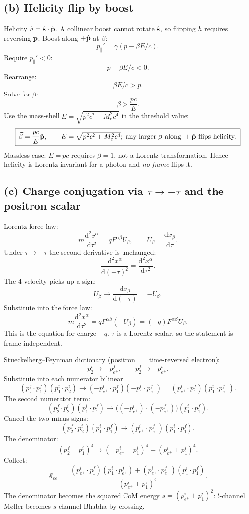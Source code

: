 \documentclass[11pt]{article}
\newcommand{\de}{\mathrm{d}}
\begin{document}
\subsection*{(b) Helicity flip by boost}

Helicity $h=\hat{\vb s}\cdot\hat{\vb p}$. A collinear boost cannot rotate $\hat{\vb s}$, so flipping $h$ requires reversing $\vb p$. Boost along $+\hat{\vb p}$ at $\beta$:
\[ p_\parallel'=\gamma(p-\beta E/c). \]
Require $p_\parallel'<0$:
\[ p-\beta E/c<0. \]
Rearrange:
\[ \beta E/c>p. \]
Solve for $\beta$:
\[ \beta>\frac{pc}{E}. \]
Use the mass-shell $E=\sqrt{p^2c^2+M_e^2c^4}$ in the threshold value:
\begin{equation}
\boxed{\,\vec\beta=\frac{pc}{E}\hat{\vb p},\qquad E=\sqrt{p^2c^2+M_e^2c^4};\ \text{any larger }\beta\text{ along }+\hat{\vb p}\text{ flips helicity}.\,}
\end{equation}
Massless case: $E=pc$ requires $\beta=1$, not a Lorentz transformation. Hence helicity is Lorentz invariant for a photon and \emph{no frame} flips it.

\subsection*{(c) Charge conjugation via $\tau\to-\tau$ and the positron scalar}

Lorentz force law:
\begin{equation}
m\frac{\de^2 x^\alpha}{\de\tau^2}=qF^{\alpha\beta}U_\beta,\qquad U_\beta=\frac{\de x_\beta}{\de\tau}.
\label{eq:Q1c-lf}
\end{equation}
Under $\tau\to-\tau$ the second derivative is unchanged:
\[ \frac{\de^2 x^\alpha}{\de(-\tau)^2}=\frac{\de^2 x^\alpha}{\de\tau^2}. \]
The 4-velocity picks up a sign:
\[ U_\beta\to\frac{\de x_\beta}{\de(-\tau)}=-U_\beta. \]
Substitute into the force law:
\[ m\frac{\de^2 x^\alpha}{\de\tau^2}=qF^{\alpha\beta}(-U_\beta)=(-q)F^{\alpha\beta}U_\beta. \]
This is the equation for charge $-q$. $\tau$ is a Lorentz scalar, so the statement is frame-independent.

Stueckelberg--Feynman dictionary (positron $=$ time-reversed electron):
\[ p_2^i\to -p_{e^+}^f,\qquad p_2^f\to -p_{e^+}^i. \]
Substitute into each numerator bilinear:
\[ (p_2^f\cdot p_1^f)(p_1^i\cdot p_2^i)\to(-p_{e^+}^i\cdot p_1^f)(-p_1^i\cdot p_{e^+}^f)=(p_{e^+}^i\cdot p_1^f)(p_1^i\cdot p_{e^+}^f). \]
The second numerator term:
\[ (p_2^f\cdot p_2^i)(p_1^i\cdot p_1^f)\to\bigl((-p_{e^+}^i)\cdot(-p_{e^+}^f)\bigr)(p_1^i\cdot p_1^f). \]
Cancel the two minus signs:
\[ (p_2^f\cdot p_2^i)(p_1^i\cdot p_1^f)\to(p_{e^+}^i\cdot p_{e^+}^f)(p_1^i\cdot p_1^f). \]
The denominator:
\[ (p_2^f-p_1^i)^4\to(-p_{e^+}^i-p_1^i)^4=(p_{e^+}^i+p_1^i)^4. \]
Collect:
\begin{equation}
\boxed{\,\mathcal{S}_{ee^+}=\frac{(p_{e^+}^i\cdot p_1^f)(p_1^i\cdot p_{e^+}^f)+(p_{e^+}^i\cdot p_{e^+}^f)(p_1^i\cdot p_1^f)}{(p_{e^+}^i+p_1^i)^4}.\,}
\end{equation}
The denominator becomes the squared CoM energy $s=(p_{e^+}^i+p_1^i)^2$: $t$-channel M{\o}ller becomes $s$-channel Bhabha by crossing.
\end{document}
